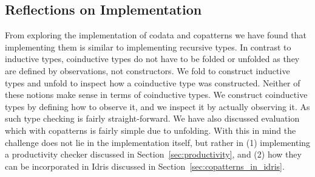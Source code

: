 \subsection{Reflections on Implementation}
From exploring the implementation of codata and copatterns we have found that implementing them is similar to implementing recursive types. In contrast to inductive types, coinductive types do not have to be folded or unfolded as they are defined by observations, not constructors. We fold to construct inductive types and unfold to inspect how a coinductive type was constructed. Neither of these notions make sense in terms of coinductive types. We construct coinductive types by defining how to observe it, and we inspect it by actually observing it. As such type checking is fairly straight-forward. We have also discussed evaluation which with copatterns is fairly simple due to unfolding. With this in mind the challenge does not lie in the implementation itself, but rather in (1) implementing a productivity checker discussed in Section~\ref{sec:productivity}, and (2) how they can be incorporated in Idris discussed in Section~\ref{sec:copatterns_in_idris}.